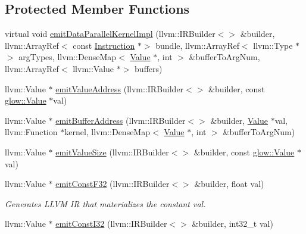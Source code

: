 \subsection*{Protected Member Functions}
\begin{DoxyCompactItemize}
\item 
virtual void \hyperlink{classglow_1_1_l_l_v_m_i_r_gen_a8f1f6b6418b0be48fbd933fe48491c2d}{emit\+Data\+Parallel\+Kernel\+Impl} (llvm\+::\+I\+R\+Builder$<$$>$ \&builder, llvm\+::\+Array\+Ref$<$ const \hyperlink{classglow_1_1_instruction}{Instruction} $\ast$$>$ bundle, llvm\+::\+Array\+Ref$<$ llvm\+::\+Type $\ast$$>$ arg\+Types, llvm\+::\+Dense\+Map$<$ \hyperlink{classglow_1_1_value}{Value} $\ast$, int $>$ \&buffer\+To\+Arg\+Num, llvm\+::\+Array\+Ref$<$ llvm\+::\+Value $\ast$$>$ buffers)
\item 
llvm\+::\+Value $\ast$ \hyperlink{classglow_1_1_l_l_v_m_i_r_gen_a78febfedef59f2e4dd47c4e8f7f11962}{emit\+Value\+Address} (llvm\+::\+I\+R\+Builder$<$$>$ \&builder, const \hyperlink{classglow_1_1_value}{glow\+::\+Value} $\ast$val)
\item 
llvm\+::\+Value $\ast$ \hyperlink{classglow_1_1_l_l_v_m_i_r_gen_a99532ebebe16fe197d589073d07c4c92}{emit\+Buffer\+Address} (llvm\+::\+I\+R\+Builder$<$$>$ \&builder, \hyperlink{classglow_1_1_value}{Value} $\ast$val, llvm\+::\+Function $\ast$kernel, llvm\+::\+Dense\+Map$<$ \hyperlink{classglow_1_1_value}{Value} $\ast$, int $>$ \&buffer\+To\+Arg\+Num)
\item 
llvm\+::\+Value $\ast$ \hyperlink{classglow_1_1_l_l_v_m_i_r_gen_a267fccf16ace7e109c96839e27112db1}{emit\+Value\+Size} (llvm\+::\+I\+R\+Builder$<$$>$ \&builder, const \hyperlink{classglow_1_1_value}{glow\+::\+Value} $\ast$val)
\item 
\mbox{\label{classglow_1_1_l_l_v_m_i_r_gen_a5c68d41607fb828c4718a3a4d3b9985c}} 
llvm\+::\+Value $\ast$ \hyperlink{classglow_1_1_l_l_v_m_i_r_gen_a5c68d41607fb828c4718a3a4d3b9985c}{emit\+Const\+F32} (llvm\+::\+I\+R\+Builder$<$$>$ \&builder, float val)
\begin{DoxyCompactList}\small\item\em Generates L\+L\+VM IR that materializes the constant {\ttfamily val}. \end{DoxyCompactList}\item 
\mbox{\label{classglow_1_1_l_l_v_m_i_r_gen_a5c170328a8dfc86b1db19b1698bea839}} 
llvm\+::\+Value $\ast$ \hyperlink{classglow_1_1_l_l_v_m_i_r_gen_a5c170328a8dfc86b1db19b1698bea839}{emit\+Const\+I32} (llvm\+::\+I\+R\+Builder$<$$>$ \&builder, int32\+\_\+t val)
$$
\end{DoxyCompactItemize}
